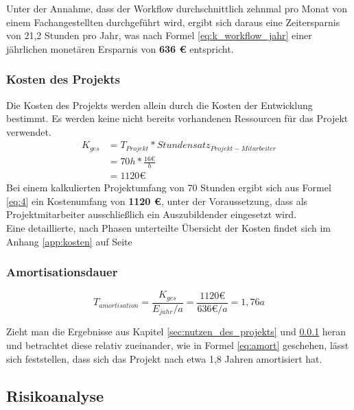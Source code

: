 \documentclass[12pt, xcolor=dvipsnames]{scrartcl}
\begin{document}
Unter der Annahme, dass der Workflow durchschnittlich zehnmal pro Monat von einem Fachangestellten durchgeführt wird, ergibt sich daraus eine Zeitersparnis von 21,2 Stunden pro Jahr, was nach Formel \ref{eq:k_workflow_jahr} einer jährlichen monetären Ersparnis von \textbf{636 \euro{}} entspricht.


\subsubsection{Kosten des Projekts}
\label{sec:kosten_des_projekts}

Die Kosten des Projekts werden allein durch die Kosten der Entwicklung bestimmt. Es werden keine nicht bereits vorhandenen Ressourcen für das Projekt verwendet.
\begin{equation} \label{eq:4}
\begin{split}
	K_{ges}	&= T_{Projekt} * Stundensatz_{Projekt-Mitarbeiter} \\
			& = 70h * \frac{16 \euro}{h} \\
			& = 1120 \euro
\end{split}
\end{equation}
Bei einem kalkulierten Projektumfang von 70 Stunden ergibt sich aus Formel \ref{eq:4} ein Kostenumfang von \textbf{1120 \euro{}}, unter der Voraussetzung, dass als Projektmitarbeiter ausschließlich ein Auszubildender eingesetzt wird. \\


Eine detaillierte, nach Phasen unterteilte Übersicht der Kosten findet sich im Anhang \ref{app:kosten} auf Seite \pageref{app:kosten}

\subsubsection{Amortisationsdauer}

\begin{equation} \label{eq:amort}
	T_{amortisation} = \frac{K_{ges}}{E_{jahr} / a} = \frac{1120 \euro}{636 \euro / a} = 1,76a
\end{equation}

Zieht man die Ergebnisse aus Kapitel \ref{sec:nutzen_des_projekts} und \ref{sec:kosten_des_projekts} heran und betrachtet diese relativ zueinander, wie in Formel \ref{eq:amort} geschehen, lässt sich feststellen, dass sich das Projekt nach etwa 1,8 Jahren amortisiert hat.



\subsection{Risikoanalyse}
\end{document}
